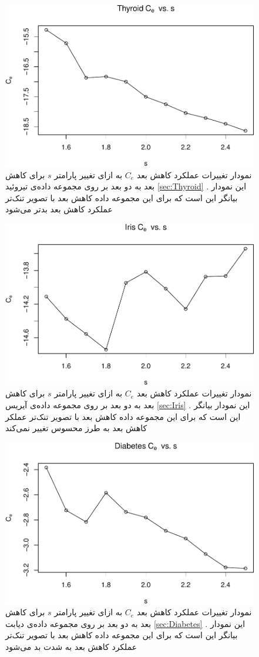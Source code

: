 \begin{figure}[H]
\centering
\includegraphics[width=0.7\linewidth]{Report_files/figure-latex/unnamed-chunk-24-1}
\caption{
نمودار تغییرات عملکرد کاهش بعد 
$C_e$
به ازای تغییر پارامتر
$s$
برای کاهش بعد به 
دو
بعد بر روی مجموعه داده‌‌‌ی 
تیروئید
\ref{sec:Thyroid}
. این نمودار بیانگر این است که برای این مجموعه داده کاهش بعد 
با تصویر تنک‌تر عملکرد کاهش بعد بدتر می‌شود
}
\end{figure}

\begin{figure}[H]
\centering
\includegraphics[width=0.7\linewidth]{Report_files/figure-latex/unnamed-chunk-24-2}
\caption{
نمودار تغییرات عملکرد کاهش بعد 
$C_e$
به ازای تغییر پارامتر
$s$
برای کاهش بعد به 
دو
 بعد بر روی مجموعه داده‌‌‌ی 
آیریس
\ref{sec:Iris}
. این نمودار بیانگر این است که برای این مجموعه داده کاهش بعد 
با تصویر تنک‌تر عملکر کاهش بعد به طرز محسوس تغییر نمی‌کند
}
\end{figure}

\begin{figure}[H]
\centering
\includegraphics[width=0.7\linewidth]{Report_files/figure-latex/unnamed-chunk-24-3}
\caption{
نمودار تغییرات عملکرد کاهش بعد 
$C_e$
به ازای تغییر پارامتر
$s$
برای کاهش بعد به 
دو
 بعد بر روی مجموعه داده‌‌‌ی 
دیابت
\ref{sec:Diabetes}
. این نمودار بیانگر این است که برای این مجموعه داده کاهش بعد 
با تصویر تنک‌تر عملکرد کاهش بعد به شدت بد می‌شود
}
\end{figure}

